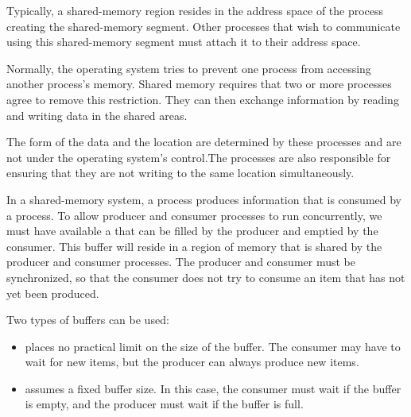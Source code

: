 
    \par Typically, a shared-memory region resides in the address space of the process creating the shared-memory segment. Other processes that wish to communicate using this shared-memory segment must attach it to their address space.
    \par Normally, the operating system tries to prevent one process from accessing another process’s memory. Shared memory requires that two or more processes agree to remove this restriction. They can then exchange information by reading and writing data in the shared areas.
    \par The form of the data and the location are determined by these processes and are not under the operating system’s control.The processes are also responsible for ensuring that they are not writing to the same location simultaneously.
    \par In a shared-memory system, a  process produces information that is consumed by a  process. To allow producer and consumer processes to run concurrently, we must have available a  that can be filled by the producer and emptied by the consumer. This buffer will reside in a region of memory that is shared by the producer and consumer processes.  The producer and consumer must be synchronized, so that the consumer does not try to consume an item that has not yet been produced.
    \par Two types of buffers can be used:
    \begin{itemize}
      \item {} places no practical limit on the size of the buffer. The consumer may have to wait for new items, but the producer can always produce new items.
      \item {} assumes a fixed buffer size. In this case, the consumer must wait if the buffer is empty, and the producer must wait if the buffer is full.
    \end{itemize}

